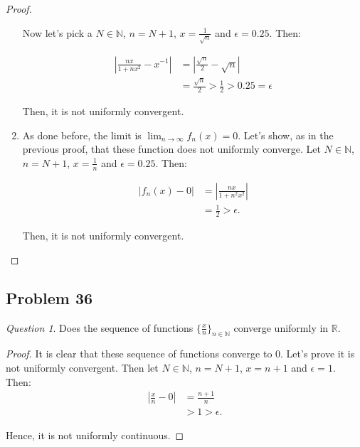 \documentclass[11pt]{article}
\theoremstyle{definition}
\theoremstyle{remark}
\theoremstyle{remark}
\newtheorem{question}{Question}
\newcommand{\N}{\mathbb{N}}
\newcommand{\R}{{\mathbb{R}}}
\newcommand{\ri}{\rightarrow}
\begin{document}
\begin{proof}
\begin{enumerate}
    Now let's pick a $N \in \N$, $n = N + 1$,
    $x = \frac{1}{\sqrt{n}}$ and $\epsilon = 0.25$. Then:

    \begin{equation*}
      \begin{split}
        \left|\frac{nx}{1 + nx^2} - x^{-1}\right| &=
        \left|\frac{\sqrt{n}}{2} - \sqrt{n}\right| \\
        &= \frac{\sqrt{n}}{2} > \frac{1}{2} > 0.25 = \epsilon
      \end{split}
    \end{equation*}

    Then, it is not uniformly convergent.

  \item As done before, the limit is $\lim_{n \ri \infty}
    f_n(x)=0$. Let's show, as in the previous proof, that these
    function does not uniformly converge. Let $N \in \N$, $n = N + 1$,
    $x = \frac{1}{n}$ and $\epsilon = 0.25$. Then:

    \begin{equation*}
      \begin{split}
        |f_n(x) - 0| &= \left|\frac{nx}{1 + n^2x^2}\right| \\
        &= \frac{1}{2} > \epsilon.
      \end{split}
    \end{equation*}

    Then, it is not uniformly convergent.
  \end{enumerate}
\end{proof}
\subsection{Problem 36}
\begin{question}
  Does the sequence of functions $\{\frac{x}{n}\}_{n \in \N}$ converge
  uniformly in $\R$.
\end{question}
\begin{proof}
  It is clear that these sequence of functions converge to $0$. Let's
  prove it is not uniformly convergent. Then let $N \in \N$,
  $n = N + 1$, $x = n + 1$ and $\epsilon = 1$. Then:
  \begin{equation*}
    \begin{split}
      \left|\frac{x}{n} - 0\right| &= \frac{n + 1}{n} \\
       &> 1 > \epsilon.
    \end{split}
  \end{equation*}

  Hence, it is not uniformly continuous.
\end{proof}
\end{document}

